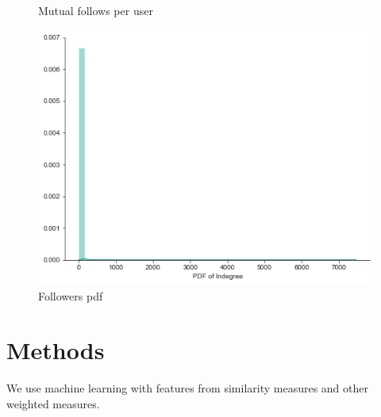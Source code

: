 \documentclass[9pt,twoside]{pnas-new}
\begin{document}
\begin{figure}%
    \centering
    \caption{Mutual follows per user}
    \label{fig:followers}
\end{figure}

\begin{figure}%
    \centering
    \includegraphics[width=.8\linewidth]{Figures/followers_pdf.png}
    \caption{Followers pdf}
    \label{fig:followers_pdf}
\end{figure}

\section*{Methods}
We use machine learning with features from similarity measures and other weighted measures\cite{6033365}.
\end{document}
